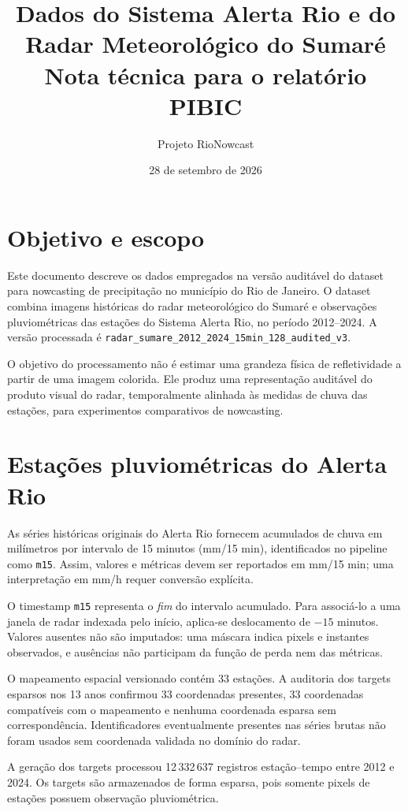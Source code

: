 \documentclass[11pt,a4paper]{article}
\title{Dados do Sistema Alerta Rio e do Radar Meteorológico do Sumaré\\\large Nota técnica para o relatório PIBIC}
\author{Projeto RioNowcast}
\date{28 de setembro de 2026}
\begin{document}
\maketitle

\section{Objetivo e escopo}
Este documento descreve os dados empregados na versão auditável do dataset para nowcasting de precipitação no município do Rio de Janeiro. O dataset combina imagens históricas do radar meteorológico do Sumaré e observações pluviométricas das estações do Sistema Alerta Rio, no período 2012--2024. A versão processada é \texttt{radar\_sumare\_2012\_2024\_15min\_128\_audited\_v3}.

O objetivo do processamento não é estimar uma grandeza física de refletividade a partir de uma imagem colorida. Ele produz uma representação auditável do produto visual do radar, temporalmente alinhada às medidas de chuva das estações, para experimentos comparativos de nowcasting.

\section{Estações pluviométricas do Alerta Rio}
As séries históricas originais do Alerta Rio fornecem acumulados de chuva em milímetros por intervalo de 15 minutos (mm/15 min), identificados no pipeline como \texttt{m15}. Assim, valores e métricas devem ser reportados em mm/15 min; uma interpretação em mm/h requer conversão explícita.

O timestamp \texttt{m15} representa o \emph{fim} do intervalo acumulado. Para associá-lo a uma janela de radar indexada pelo início, aplica-se deslocamento de $-15$ minutos. Valores ausentes não são imputados: uma máscara indica pixels e instantes observados, e ausências não participam da função de perda nem das métricas.

O mapeamento espacial versionado contém 33 estações. A auditoria dos targets esparsos nos 13 anos confirmou 33 coordenadas presentes, 33 coordenadas compatíveis com o mapeamento e nenhuma coordenada esparsa sem correspondência. Identificadores eventualmente presentes nas séries brutas não foram usados sem coordenada validada no domínio do radar.

A geração dos targets processou 12\,332\,637 registros estação--tempo entre 2012 e 2024. Os targets são armazenados de forma esparsa, pois somente pixels de estações possuem observação pluviométrica.
\end{document}
